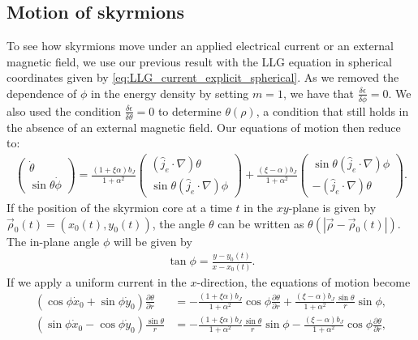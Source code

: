 \documentclass[1p]{elsarticle}		%
\numberwithin{equation}{section}
\begin{document}
\subsection{Motion of skyrmions}
To see how skyrmions move under an applied electrical current or an external magnetic field, we use our previous result with the LLG equation in spherical coordinates given by \eqref{eq:LLG_current_explicit_spherical}. As we removed the dependence of $\phi$ in the energy density by setting $m=1$, we have that $\frac{\delta \epsilon}{\delta \phi} = 0$. We also used the condition $\frac{\delta\epsilon}{\delta\theta}=0$ to determine $\theta(\rho)$, a condition that still holds in the absence of an external magnetic field. Our equations of motion then reduce to: 
\begin{align}
\nonumber \begin{pmatrix}
\dot{\theta} \\ \sin\theta\dot{\phi}
\end{pmatrix} =
\frac{(1+\xi\alpha)b_J}{1+\alpha^2}
\begin{pmatrix}
(\hat{j}_e\cdot\nabla)\theta \\ \sin\theta(\hat{j}_e\cdot\nabla)\phi
\end{pmatrix}
+\frac{(\xi-\alpha)b_J}{1+\alpha^2}
\begin{pmatrix}
\sin\theta(\hat{j}_e\cdot\nabla)\phi \\ -(\hat{j}_e\cdot\nabla)\theta
\end{pmatrix}.
\label{eq:LLG_skyrmion_current}
\end{align}
If the position of the skyrmion core at a time $t$ in the $xy$-plane is given by $\vec{\rho}_0(t) = \left( x_0(t), y_0(t)\right)$, the angle $\theta$ can be written as $\theta(|\vec{\rho}-\vec{\rho}_0(t)|)$. The in-plane angle $\phi$ will be given by
\begin{align}
\tan\phi = \frac{y-y_0(t)}{x-x_0(t)}.
\end{align}
If we apply a uniform current in the $x$-direction, the equations of motion become
\begin{align}
(\cos\phi\dot{x}_0+\sin\phi\dot{y}_0)\frac{\partial \theta}{\partial r} &= - \frac{(1+\xi\alpha)b_J}{1+\alpha^2}\cos\phi\frac{\partial\theta}{\partial r} + \frac{(\xi-\alpha)b_J}{1+\alpha^2}\frac{\sin\theta}{r}\sin\phi, \\
(\sin\phi\dot{x}_0-\cos\phi\dot{y}_0)\frac{\sin\theta}{r} &= -\frac{(1+\xi\alpha)b_J}{1+\alpha^2}\frac{\sin\theta}{r}\sin\phi-\frac{(\xi-\alpha)b_J}{1+\alpha^2} \cos\phi \frac{\partial \theta}{\partial r},
\end{align}
\end{document}
